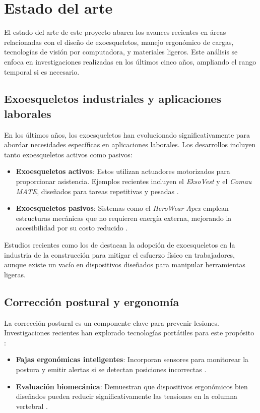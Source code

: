 \section{Estado del arte}
El estado del arte de este proyecto abarca los avances recientes en áreas relacionadas con el diseño de exoesqueletos, manejo ergonómico de cargas, tecnologías de visión por computadora, y materiales ligeros. Este análisis se enfoca en investigaciones realizadas en los últimos cinco años, ampliando el rango temporal si es necesario.

\subsection{Exoesqueletos industriales y aplicaciones laborales}
En los últimos años, los exoesqueletos han evolucionado significativamente para abordar necesidades específicas en aplicaciones laborales. Los desarrollos incluyen tanto exoesqueletos activos como pasivos:
\begin{itemize}
    \item \textbf{Exoesqueletos activos}: Estos utilizan actuadores motorizados para proporcionar asistencia. Ejemplos recientes incluyen el \textit{EksoVest} \cite{garcia2020integratedai} y el \textit{Comau MATE}, diseñados para tareas repetitivas y pesadas \cite{ramirez2021specifictasks}.
    \item \textbf{Exoesqueletos pasivos}: Sistemas como el \textit{HeroWear Apex} emplean estructuras mecánicas que no requieren energía externa, mejorando la accesibilidad por su costo reducido \cite{smith2021ergonomic, gomez2022hybridsystems}.
\end{itemize}

Estudios recientes como los de \cite{kim2018overview, johnson2018biomechanics} destacan la adopción de exoesqueletos en la industria de la construcción para mitigar el esfuerzo físico en trabajadores, aunque existe un vacío en dispositivos diseñados para manipular herramientas ligeras.

\subsection{Corrección postural y ergonomía}
La corrección postural es un componente clave para prevenir lesiones. Investigaciones recientes han explorado tecnologías portátiles para este propósito \cite{liu2023posturalstudy, choi2020carbonfiber}:
\begin{itemize}
    \item \textbf{Fajas ergonómicas inteligentes}: Incorporan sensores para monitorear la postura y emitir alertas si se detectan posiciones incorrectas \cite{brown2022ergonomics}.
    \item \textbf{Evaluación biomecánica}: Demuestran que dispositivos ergonómicos bien diseñados pueden reducir significativamente las tensiones en la columna vertebral \cite{johnson2018biomechanics}.
\end{itemize}

